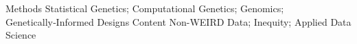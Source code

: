 

\begin{interests}

  \interest
    {Methods} %
    {Statistical Genetics; Computational Genetics; Genomics; Genetically‑Informed Designs}
  \interest
    {Content} %
    {Non-WEIRD Data; Inequity; Applied Data Science} %

\end{interests}
